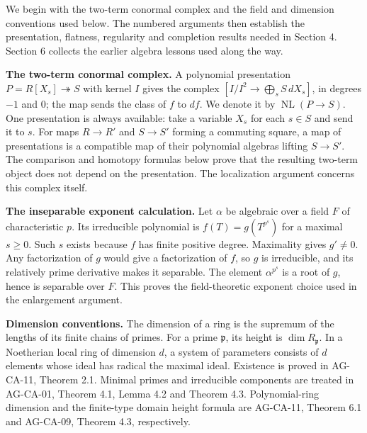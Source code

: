 \documentclass[11pt,a4paper,openany]{report}
\begin{document}
We begin with the two-term conormal complex and the field and dimension conventions used below. The numbered arguments then establish the presentation, flatness, regularity and completion results needed in Section 4. Section 6 collects the earlier algebra lessons used along the way.

\label{AG-RG-S05-cotangent-context}

\textbf{The two-term conormal complex.} A polynomial presentation \(P=R[X_s]\twoheadrightarrow S\) with kernel \(I\) gives the complex \([I/I^2\to\bigoplus_s S\,dX_s]\), in degrees \(-1\) and \(0\); the map sends the class of \(f\) to \(df\). We denote it by \(\operatorname{NL}(P\to S)\). One presentation is always available: take a variable \(X_s\) for each \(s\in S\) and send it to \(s\). For maps \(R\to R'\) and \(S\to S'\) forming a commuting square, a map of presentations is a compatible map of their polynomial algebras lifting \(S\to S'\). The comparison and homotopy formulas below prove that the resulting two-term object does not depend on the presentation. The localization argument concerns this complex itself.

\label{AG-RG-S05-inseparable-exponent-context}

\textbf{The inseparable exponent calculation.} Let \(\alpha\) be algebraic over a field \(F\) of characteristic \(p\). Its irreducible polynomial is \(f(T)=g(T^{p^s})\) for a maximal \(s\geq0\). Such \(s\) exists because \(f\) has finite positive degree. Maximality gives \(g'\ne0\). Any factorization of \(g\) would give a factorization of \(f\), so \(g\) is irreducible, and its relatively prime derivative makes it separable. The element \(\alpha^{p^s}\) is a root of \(g\), hence is separable over \(F\). This proves the field-theoretic exponent choice used in the enlargement argument.

\label{AG-RG-S05-dimension-context}

\textbf{Dimension conventions.} The dimension of a ring is the supremum of the lengths of its finite chains of primes. For a prime \(\mathfrak p\), its height is \(\dim R_{\mathfrak p}\). In a Noetherian local ring of dimension \(d\), a system of parameters consists of \(d\) elements whose ideal has radical the maximal ideal. Existence is proved in AG-CA-11, Theorem 2.1. Minimal primes and irreducible components are treated in AG-CA-01, Theorem 4.1, Lemma 4.2 and Theorem 4.3. Polynomial-ring dimension and the finite-type domain height formula are AG-CA-11, Theorem 6.1 and AG-CA-09, Theorem 4.3, respectively.
\end{document}
